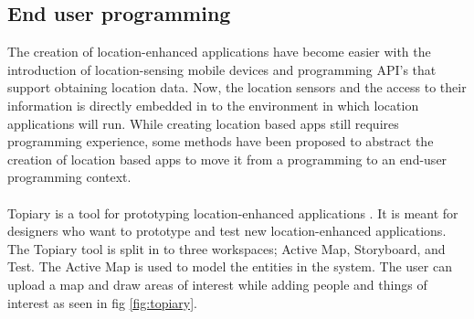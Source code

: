 \subsection{End user programming} %
\label{sub:end_user_programming}
The creation of location-enhanced applications have become easier with the introduction of location-sensing mobile devices and programming API's that support obtaining location data. Now, the location sensors and the access to their information is directly embedded in to the environment in which location applications will run. While creating location based apps still requires programming experience, some methods have been proposed to abstract the creation of location based apps to move it from a programming to an end-user programming context. 
\\\\
Topiary is a tool for prototyping location-enhanced applications \cite{Li:2004:TTP:1029632.1029671}. It is meant for designers who want to prototype and test new location-enhanced applications. The Topiary tool is split in to three workspaces; Active Map, Storyboard, and Test. The Active Map is used to model the entities in the system. The user can upload a map and draw areas of interest while adding people and things of interest as seen in fig \ref{fig:topiary}.

